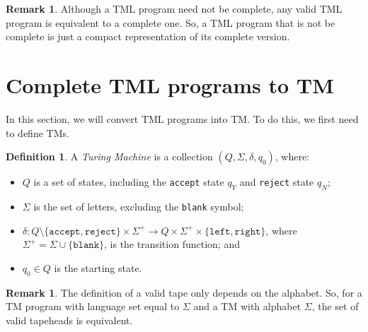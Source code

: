 \documentclass{article}
\theoremstyle{definition}
\newtheorem{definition}[theorem]{Definition}
\newtheorem{remark}[theorem]{Remark}
\begin{document}
    \begin{remark}
        Although a TML program need not be complete, any valid TML program is equivalent to a complete one. So, a TML program that is not be complete is just a compact representation of its complete version.
    \end{remark}

    \section{Complete TML programs to TM}
    In this section, we will convert TML programs into TM. To do this, we first need to define TMs.
    \begin{definition}
        A \emph{Turing Machine} is a collection $(Q, \Sigma, \delta, q_0)$, where:
        \begin{itemize}
            \item $Q$ is a set of states, including the \texttt{accept} state $q_Y$ and \texttt{reject} state $q_N$;
            \item $\Sigma$ is the set of letters, excluding the \texttt{blank} symbol;
            \item $\delta: Q \setminus \{\texttt{accept}, \texttt{reject}\} \times \Sigma^+ \to Q \times \Sigma^+ \times \{\texttt{left}, \texttt{right}\}$, where $\Sigma^+ = \Sigma \cup \{\texttt{blank}\}$, is the transition function; and
            \item $q_0 \in Q$ is the starting state.
        \end{itemize}
    \end{definition}

    \begin{remark}
        The definition of a valid tape only depends on the alphabet. So, for a TM program with language set equal to $\Sigma$ and a TM with alphabet $\Sigma$, the set of valid tapeheads is equivalent.
    \end{remark}
    
\end{document}
